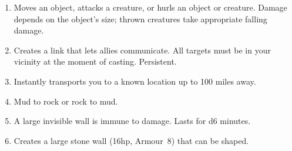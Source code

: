 \documentclass[itdr]{subfiles}
\begin{document}
\begin{enumerate}
	\item {} Moves an object, attacks a creature, or hurls an object or creature. Damage \mbox{depends} on the object's size; thrown creatures take appropriate falling damage.
	\item {} Creates a link that lets allies communicate. All targets must be in your vicinity at the moment of casting. \mbox{Persistent.}
	\item {} Instantly transports you to a known location up to 100 miles away.
	\item {} Mud to rock or rock to mud.
	\item {} A large invisible wall is immune to damage. Lasts for d6 minutes.
	\item {} Creates a large stone wall (16hp, Armour~8) that can be shaped.
\end{enumerate}

\vfill
\break
\end{document}
